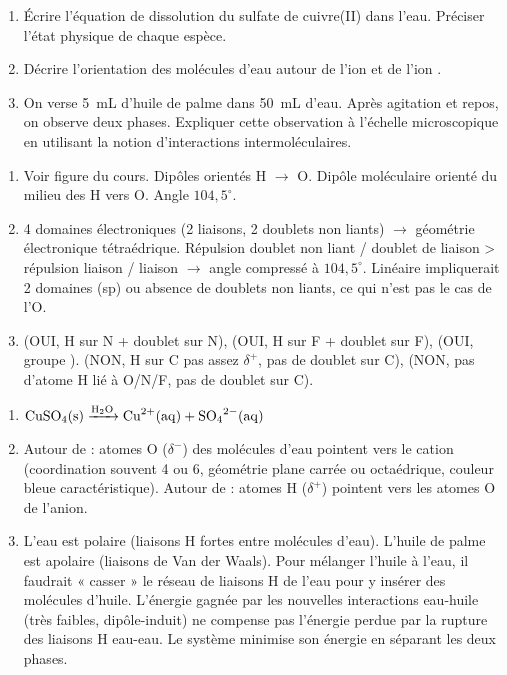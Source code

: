 \documentclass[11pt]{article}
\begin{document}
\begin{exercice}
\begin{enumerate}
    \item Écrire l'équation de dissolution du sulfate de cuivre(II)  dans l'eau. Préciser l'état physique de chaque espèce.
    \item Décrire l'orientation des molécules d'eau autour de l'ion  et de l'ion .
    \item On verse \SI{5}{mL} d'huile de palme dans \SI{50}{mL} d'eau. Après agitation et repos, on observe deux phases. Expliquer cette observation à l'échelle microscopique en utilisant la notion d'interactions intermoléculaires.
\end{enumerate}
\end{exercice}

\begin{corrige}[Exercice 1]
\begin{enumerate}
    \item Voir figure du cours. Dipôles  orientés H $\to$ O. Dipôle moléculaire orienté du milieu des H vers O. Angle $104,5^\circ$.
    \item 4 domaines électroniques (2 liaisons, 2 doublets non liants) $\to$ géométrie électronique tétraédrique. Répulsion doublet non liant / doublet de liaison > répulsion liaison / liaison $\to$ angle compressé à $104,5^\circ$. Linéaire impliquerait 2 domaines (sp) ou absence de doublets non liants, ce qui n'est pas le cas de l'O.
    \item {} (OUI, H sur N + doublet sur N),  (OUI, H sur F + doublet sur F),  (OUI, groupe ).  (NON, H sur C pas assez $\delta^+$, pas de doublet sur C),  (NON, pas d'atome H lié à O/N/F, pas de doublet sur C).
\end{enumerate}
\end{corrige}

\begin{corrige}[Exercice 2]
\begin{enumerate}
    \item $\ce{CuSO4(s) ->[H2O] Cu^{2+}(aq) + SO4^{2-}(aq)}$
    \item Autour de  : atomes O ($\delta^-$) des molécules d'eau pointent vers le cation (coordination souvent 4 ou 6, géométrie plane carrée ou octaédrique, couleur bleue caractéristique). Autour de  : atomes H ($\delta^+$) pointent vers les atomes O de l'anion.
    \item L'eau est polaire (liaisons H fortes entre molécules d'eau). L'huile de palme est apolaire (liaisons de Van der Waals). Pour mélanger l'huile à l'eau, il faudrait « casser » le réseau de liaisons H de l'eau pour y insérer des molécules d'huile. L'énergie gagnée par les nouvelles interactions eau-huile (très faibles, dipôle-induit) ne compense pas l'énergie perdue par la rupture des liaisons H eau-eau. Le système minimise son énergie en séparant les deux phases.
\end{enumerate}
\end{corrige}
\end{document}
